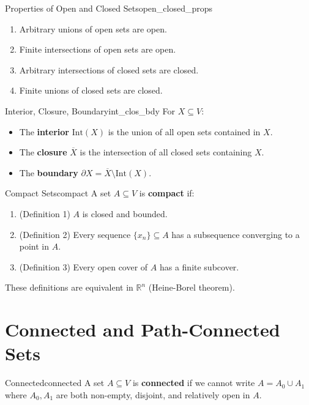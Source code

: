 \documentclass[11pt, letterpaper, openany]{book}
\begin{document}
\begin{thm}{Properties of Open and Closed Sets}{open_closed_props}
\begin{enumerate}
    \item Arbitrary unions of open sets are open.
    \item Finite intersections of open sets are open.
    \item Arbitrary intersections of closed sets are closed.
    \item Finite unions of closed sets are closed.
\end{enumerate}
\end{thm}

\begin{defn}{Interior, Closure, Boundary}{int_clos_bdy}
For $X \subseteq V$:
\begin{itemize}
    \item The \textbf{interior} $\text{Int}(X)$ is the union of all open sets contained in $X$.
    \item The \textbf{closure} $\overline{X}$ is the intersection of all closed sets containing $X$.
    \item The \textbf{boundary} $\partial X = \overline{X} \setminus \text{Int}(X)$.
\end{itemize}
\end{defn}

\begin{defn}{Compact Sets}{compact}
A set $A \subseteq V$ is \textbf{compact} if:
\begin{enumerate}
    \item (Definition 1) $A$ is closed and bounded.
    \item (Definition 2) Every sequence $\{x_n\} \subseteq A$ has a subsequence converging to a point in $A$.
    \item (Definition 3) Every open cover of $A$ has a finite subcover.
\end{enumerate}
These definitions are equivalent in $\mathbb{R}^n$ (Heine-Borel theorem).
\end{defn}

\section{Connected and Path-Connected Sets}

\begin{defn}{Connected}{connected}
A set $A \subseteq V$ is \textbf{connected} if we cannot write $A = A_0 \cup A_1$ where $A_0, A_1$ are both non-empty, disjoint, and relatively open in $A$.
\end{defn}
\end{document}
